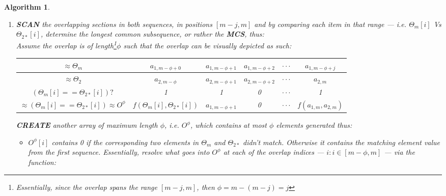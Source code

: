 \documentclass[a4paper, 18pt]{article} %
\newtheorem{alg}{Algorithm}
\newcommand{\invpi}{\rotatebox[origin=c]{180}{$\pi$}}
\begin{document}
\begin{alg}
\begin{enumerate}
{\begin{enumerate}
{and so that $\Theta_2$ shall be occupying the updated range: 

\vspace{1em}
$A_2: [m + 1 - j,\quad m+\invpi(\Theta_{2*}) - j]$
\vspace{1em}
}
\item {
\textbf{SCAN}  the overlapping sections in both sequences, in positions  $[m-j, m]$ and by comparing each item in that range --- i.e. $\Theta_m[i]$ Vs $\Theta_{2*}[i]$, determine the longest common subsequence, or rather the \textbf{MCS}, thus:\\

Assume the overlap is of length\footnote{Essentially, since the overlap spans the range $[m-j, m]$, then $\phi = m - (m-j) = j$}$\phi$ such that the overlap can be visually depicted as such:

{

\vspace{2em}
\begin{adjustwidth}{-4em}{}
\begin{tabular}[H]{|c||c|c|c|c|c|}
\hline
$\approx \Theta_m$ & $a_{1,m-\phi+0}$ &$a_{1,m-\phi+1}$ & $a_{1,m-\phi+2}$ & $\cdot\cdot\cdot$ & $a_{1,m-\phi+j}$\\
\hline
$\approx \Theta_2$ & $a_{2,m-\phi}$ &$a_{2,m-\phi+1}$ & $a_{2,m-\phi+2}$ & $\cdot\cdot\cdot$ & $a_{2,m}$\\
\hline
$(\Theta_m[i] == \Theta_{2*}[i])?$ & 1 & 1& 0 &  $\cdot\cdot\cdot$ & 1\\
\hline
$\approx (\Theta_m[i] == \Theta_{2*}[i]) \approx O^\phi$ & $f(\Theta_m[i],\Theta_{2*}[i])$ & $a_{1,m-\phi+1}$ & 0 &  $\cdot\cdot\cdot$ & $f(a_{1,m},a_{2,m})$ \\
\hline
 \end{tabular}
 \end{adjustwidth}
  \vspace{2em}

 }

 
 \textbf{CREATE}  another array of maximum length $\phi$, i.e. $O^\phi$, which contains at most $\phi$ elements generated thus:
 \begin{itemize}
 \item{ $O^\phi[i]$ contains 0 if the corresponding two elements in $\Theta_m$ and $\Theta_{2*}$ didn't match. Otherwise it contains the matching element value from the first sequence. Essentially, resolve what goes into $O^\phi$ at each of the overlap indices --- $i: i \in [m-\phi, m]$ ---  via the function:
 
}
\end{itemize}}
\end{enumerate}}
\end{enumerate}
\end{alg}
\end{document}
